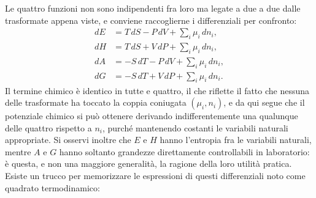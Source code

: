 Le quattro funzioni non sono indipendenti fra loro ma legate a due a due dalle trasformate appena viste, e conviene raccoglierne i differenziali per confronto:
\begin{align}
    dE &= T\,dS - P\,dV + \sum_i \mu_i\,dn_i , \label{eq:riepilogo_E}\\
    dH &= T\,dS + V\,dP + \sum_i \mu_i\,dn_i , \label{eq:riepilogo_H}\\
    dA &= -S\,dT - P\,dV + \sum_i \mu_i\,dn_i , \label{eq:riepilogo_A}\\
    dG &= -S\,dT + V\,dP + \sum_i \mu_i\,dn_i . \label{eq:riepilogo_G}
\end{align}
Il termine chimico è identico in tutte e quattro, il che riflette il fatto che nessuna delle trasformate ha toccato la coppia coniugata $(\mu_i, n_i)$, e da qui segue che il potenziale chimico si può ottenere derivando indifferentemente una qualunque delle quattro rispetto a $n_i$, purché mantenendo costanti le variabili naturali appropriate.
Si osservi inoltre che $E$ e $H$ hanno l'entropia fra le variabili naturali, mentre $A$ e $G$ hanno soltanto grandezze direttamente controllabili in laboratorio: è questa, e non una maggiore generalità, la ragione della loro utilità pratica.\\

Esiste un trucco per memorizzare le espressioni di questi differenziali noto come quadrato termodinamico:

\begin{figure}[htbp]
    \centering
    \label{fig:quadrato}
\end{figure}
 
